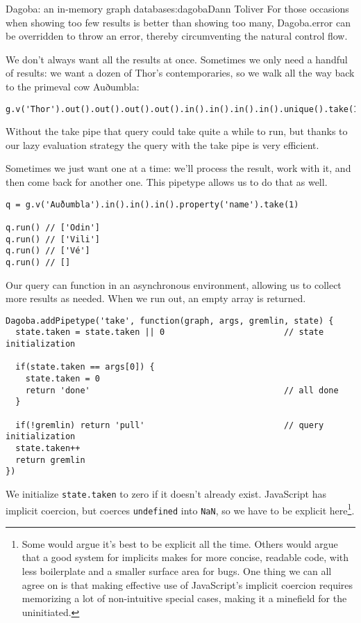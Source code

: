 \begin{aosachapter}{Dagoba: an in-memory graph database}{s:dagoba}{Dann Toliver}
For those occasions when showing too few results is better than showing
too many, Dagoba.error can be overridden to throw an error, thereby
circumventing the natural control flow.

\label{take}

We don't always want all the results at once. Sometimes we only need a
handful of results: we want a dozen of Thor's contemporaries, so we walk
all the way back to the primeval cow Auðumbla:

\begin{verbatim}
g.v('Thor').out().out().out().out().in().in().in().in().unique().take(12).run()
\end{verbatim}

Without the take pipe that query could take quite a while to run, but
thanks to our lazy evaluation strategy the query with the take pipe is
very efficient.

Sometimes we just want one at a time: we'll process the result, work
with it, and then come back for another one. This pipetype allows us to
do that as well.

\begin{verbatim}
q = g.v('Auðumbla').in().in().in().property('name').take(1)

q.run() // ['Odin']
q.run() // ['Vili']
q.run() // ['Vé']
q.run() // []
\end{verbatim}

Our query can function in an asynchronous environment, allowing us to
collect more results as needed. When we run out, an empty array is
returned.

\begin{verbatim}
Dagoba.addPipetype('take', function(graph, args, gremlin, state) {
  state.taken = state.taken || 0                        // state initialization
  
  if(state.taken == args[0]) {
    state.taken = 0
    return 'done'                                       // all done
  }
  
  if(!gremlin) return 'pull'                            // query initialization
  state.taken++
  return gremlin
})
\end{verbatim}

We initialize \texttt{state.taken} to zero if it doesn't already exist.
JavaScript has implicit coercion, but coerces \texttt{undefined} into
\texttt{NaN}, so we have to be explicit here\footnote{Some would argue
  it's best to be explicit all the time. Others would argue that a good
  system for implicits makes for more concise, readable code, with less
  boilerplate and a smaller surface area for bugs. One thing we can all
  agree on is that making effective use of JavaScript's implicit
  coercion requires memorizing a lot of non-intuitive special cases,
  making it a minefield for the uninitiated.}.


\end{aosachapter}
